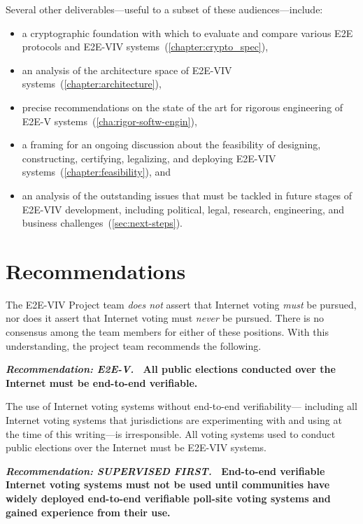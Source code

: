 Several other deliverables---useful to a subset of these
audiences---include:
\begin{itemize}
\item a cryptographic foundation with which to evaluate and compare
  various E2E protocols and E2E-VIV
  systems~(\autoref{chapter:crypto_spec}),
\item an analysis of the architecture space of E2E-VIV
  systems~(\autoref{chapter:architecture}),
\item precise recommendations on the state of the art for rigorous
  engineering of E2E-V systems~(\autoref{cha:rigor-softw-engin}),
\item a framing for an ongoing discussion about the feasibility of
  designing, constructing, certifying, legalizing, and deploying
  E2E-VIV systems~(\autoref{chapter:feasibility}), and
\item an analysis of the outstanding issues that must be tackled in
  future stages of E2E-VIV development, including political, legal,
  research, engineering, and business
  challenges~(\autoref{sec:next-steps}).
\end{itemize}

\section{Recommendations}

The E2E-VIV Project team \emph{does not} assert that Internet voting
\emph{must} be pursued, nor does it assert that Internet voting must
\emph{never} be pursued. There is no consensus among the team members
for either of these positions. With this understanding, the project
team recommends the following.

\vspace{12pt} 
\textbf{\emph{Recommendation: E2E-V.} \ All public elections conducted
  over the Internet must be end-to-end verifiable.} 

The use of Internet voting systems without end-to-end verifiability---
including all Internet voting systems that jurisdictions are
experimenting with and using at the time of this writing---is
irresponsible. All voting systems used to conduct public elections
over the Internet must be E2E-VIV systems.

\vspace{12pt}
\textbf{\emph{Recommendation: SUPERVISED FIRST.} \ End-to-end
  verifiable Internet voting systems must not be used until
  communities have widely deployed end-to-end verifiable poll-site
  voting systems and gained experience from their use.}

